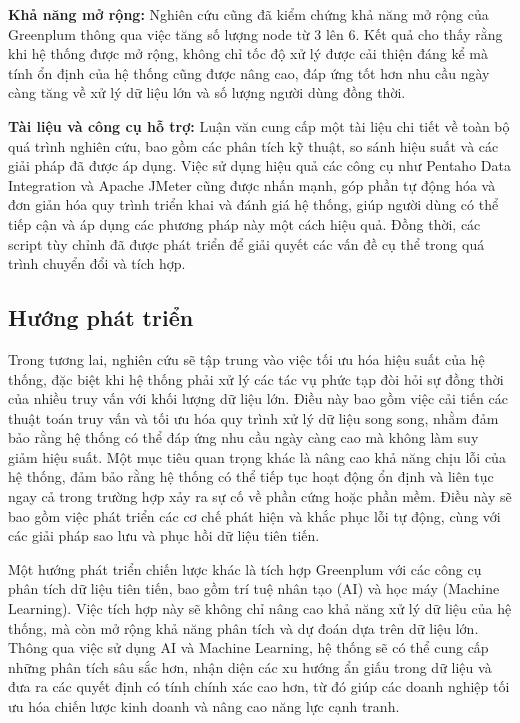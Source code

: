 \documentclass{article}[14pt]
\begin{document}
\textbf{Khả năng mở rộng:} Nghiên cứu cũng đã kiểm chứng khả năng mở rộng của Greenplum thông qua việc tăng số lượng node từ 3 lên 6. Kết quả cho thấy rằng khi hệ thống được mở rộng, không chỉ tốc độ xử lý được cải thiện đáng kể mà tính ổn định của hệ thống cũng được nâng cao, đáp ứng tốt hơn nhu cầu ngày càng tăng về xử lý dữ liệu lớn và số lượng người dùng đồng thời.

\textbf{Tài liệu và công cụ hỗ trợ:} Luận văn cung cấp một tài liệu chi tiết về toàn bộ quá trình nghiên cứu, bao gồm các phân tích kỹ thuật, so sánh hiệu suất và các giải pháp đã được áp dụng. Việc sử dụng hiệu quả các công cụ như Pentaho Data Integration và Apache JMeter cũng được nhấn mạnh, góp phần tự động hóa và đơn giản hóa quy trình triển khai và đánh giá hệ thống, giúp người dùng có thể tiếp cận và áp dụng các phương pháp này một cách hiệu quả. Đồng thời, các script tùy chỉnh đã được phát triển để giải quyết các vấn đề cụ thể trong quá trình chuyển đổi và tích hợp.

\subsection{Hướng phát triển}

Trong tương lai, nghiên cứu sẽ tập trung vào việc tối ưu hóa hiệu suất của hệ thống, đặc biệt khi hệ thống phải xử lý các tác vụ phức tạp đòi hỏi sự đồng thời của nhiều truy vấn với khối lượng dữ liệu lớn. Điều này bao gồm việc cải tiến các thuật toán truy vấn và tối ưu hóa quy trình xử lý dữ liệu song song, nhằm đảm bảo rằng hệ thống có thể đáp ứng nhu cầu ngày càng cao mà không làm suy giảm hiệu suất. Một mục tiêu quan trọng khác là nâng cao khả năng chịu lỗi của hệ thống, đảm bảo rằng hệ thống có thể tiếp tục hoạt động ổn định và liên tục ngay cả trong trường hợp xảy ra sự cố về phần cứng hoặc phần mềm. Điều này sẽ bao gồm việc phát triển các cơ chế phát hiện và khắc phục lỗi tự động, cùng với các giải pháp sao lưu và phục hồi dữ liệu tiên tiến.

Một hướng phát triển chiến lược khác là tích hợp Greenplum với các công cụ phân tích dữ liệu tiên tiến, bao gồm trí tuệ nhân tạo (AI) và học máy (Machine Learning). Việc tích hợp này sẽ không chỉ nâng cao khả năng xử lý dữ liệu của hệ thống, mà còn mở rộng khả năng phân tích và dự đoán dựa trên dữ liệu lớn. Thông qua việc sử dụng AI và Machine Learning, hệ thống sẽ có thể cung cấp những phân tích sâu sắc hơn, nhận diện các xu hướng ẩn giấu trong dữ liệu và đưa ra các quyết định có tính chính xác cao hơn, từ đó giúp các doanh nghiệp tối ưu hóa chiến lược kinh doanh và nâng cao năng lực cạnh tranh.
\end{document}
